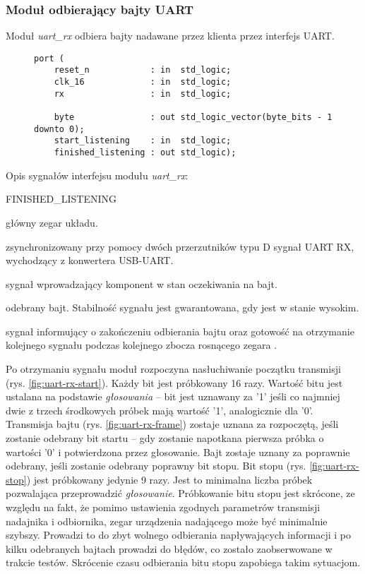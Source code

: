 \subsubsection{Moduł odbierający bajty UART}
Moduł \textit{uart\_rx} odbiera bajty nadawane przez klienta przez interfejs UART.

\begin{figure}[!h]
\begin{lstlisting}[style=vhdl, captionpos=b, caption={\textit{uart\_rx} -- interfejs modułu}]
port (
	reset_n            : in  std_logic;
	clk_16             : in  std_logic;
	rx                 : in  std_logic;
		
	byte               : out std_logic_vector(byte_bits - 1 downto 0);
	start_listening    : in  std_logic;
	finished_listening : out std_logic);
\end{lstlisting}
\end{figure}

Opis sygnałów interfejsu modułu \textit{uart\_rx}:
\begin{interface}{FINISHED\_LISTENING}
	\item[\insignal{CLK\_16}] główny zegar układu.
	\item[\insignal{RX}] zsynchronizowany przy pomocy dwóch przerzutników typu D sygnał UART RX, wychodzący z konwertera USB-UART.
	\item[\insignal{START\_LISTENING}] sygnał wprowadzający komponent w stan oczekiwania na bajt.
	\item[\outsignal{BYTE[7:0]}] odebrany bajt. Stabilność sygnału jest gwarantowana, gdy  jest w stanie wysokim.
	\item[\outsignal{FINISHED\_LISTENING}] sygnał informujący o zakończeniu odbierania bajtu oraz gotowość na otrzymanie kolejnego sygnału  podczas kolejnego zbocza rosnącego zegara .
\end{interface}

Po otrzymaniu sygnału  moduł rozpoczyna nasłuchiwanie początku transmisji (rys. \ref{fig:uart-rx-start}). Każdy bit jest próbkowany 16 razy. Wartość bitu jest ustalana na podstawie \textit{głosowania} -- bit jest uznawany za {'1'} jeśli co najmniej dwie z trzech środkowych próbek mają wartość {'1'}, analogicznie dla {'0'}. Transmisja bajtu (rys. \ref{fig:uart-rx-frame}) zostaje uznana za rozpoczętą, jeśli zostanie odebrany bit startu -- gdy zostanie napotkana pierwsza próbka o wartości {'0'} i potwierdzona przez głosowanie. Bajt zostaje uznany za poprawnie odebrany, jeśli zostanie odebrany poprawny bit stopu. Bit stopu (rys. \ref{fig:uart-rx-stop}) jest próbkowany jedynie 9 razy. Jest to minimalna liczba próbek pozwalająca przeprowadzić \textit{głosowanie}. Próbkowanie bitu stopu jest skrócone, ze względu na fakt, że pomimo ustawienia zgodnych parametrów transmisji nadajnika i odbiornika, zegar urządzenia nadającego może być minimalnie szybszy. Prowadzi to do zbyt wolnego odbierania napływających informacji i po kilku odebranych bajtach prowadzi do błędów, co zostało zaobserwowane w trakcie testów. Skrócenie czasu odbierania bitu stopu zapobiega takim sytuacjom.

